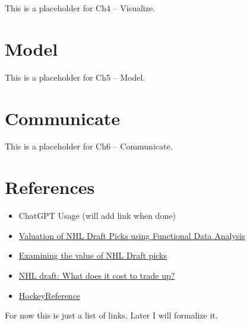 \documentclass[
  letterpaper,
  DIV=11,
  numbers=noendperiod]{scrreprt}
\newlength{\cslhangindent}
\newenvironment{CSLReferences}[2] %
 {\begin{list}{}{%
  \setlength{\itemindent}{0pt}
  \setlength{\leftmargin}{0pt}
  \setlength{\parsep}{0pt}
  \ifodd #1
   \setlength{\leftmargin}{\cslhangindent}
   \setlength{\itemindent}{-1\cslhangindent}
  \fi
  \setlength{\itemsep}{#2\baselineskip}}}
 {\end{list}}
\begin{document}
This is a placeholder for Ch4 -- Visualize.


\chapter{Model}\label{model}

This is a placeholder for Ch5 -- Model.


\chapter{Communicate}\label{communicate}

This is a placeholder for Ch6 -- Communicate.


\chapter*{References}\label{references}


\label{refs}
\begin{CSLReferences}{0}{1}
\begin{itemize}
\item
  ChatGPT Usage (will add link when done)
\item
  \href{https://summit.sfu.ca/_flysystem/fedora/2023-02/etd22223.pdf}{Valuation
  of NHL Draft Picks using Functional Data Analysis}
\item
  \href{https://soundofhockey.com/2022/06/06/examining-the-value-of-nhl-draft-picks/amp/}{Examining
  the value of NHL Draft picks}
\item
  \href{https://www.broadstreethockey.com/post/nhl-draft-pick-value-trading-up/}{NHL
  draft: What does it cost to trade up?}
\item
  \href{https://www.hockey-reference.com/draft/}{HockeyReference}
\end{itemize}

\end{CSLReferences}

For now this is just a list of links. Later I will formalize it.
\end{document}
